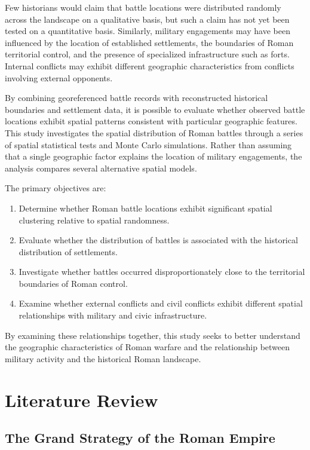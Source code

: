\documentclass[
  letterpaper,
  DIV=11,
  numbers=noendperiod]{scrartcl}
\providecommand{\tightlist}{%
  \setlength{\itemsep}{0pt}\setlength{\parskip}{0pt}}\usepackage{longtable,booktabs,array}
\begin{document}
Few historians would claim that battle locations were distributed
randomly across the landscape on a qualitative basis, but such a claim
has not yet been tested on a quantitative basis. Similarly, military
engagements may have been influenced by the location of established
settlements, the boundaries of Roman territorial control, and the
presence of specialized infrastructure such as forts. Internal conflicts
may exhibit different geographic characteristics from conflicts
involving external opponents.

By combining georeferenced battle records with reconstructed historical
boundaries and settlement data, it is possible to evaluate whether
observed battle locations exhibit spatial patterns consistent with
particular geographic features. This study investigates the spatial
distribution of Roman battles through a series of spatial statistical
tests and Monte Carlo simulations. Rather than assuming that a single
geographic factor explains the location of military engagements, the
analysis compares several alternative spatial models.

The primary objectives are:

\begin{enumerate}
\def\labelenumi{\arabic{enumi}.}
\tightlist
\item
  Determine whether Roman battle locations exhibit significant spatial
  clustering relative to spatial randomness.
\item
  Evaluate whether the distribution of battles is associated with the
  historical distribution of settlements.
\item
  Investigate whether battles occurred disproportionately close to the
  territorial boundaries of Roman control.
\item
  Examine whether external conflicts and civil conflicts exhibit
  different spatial relationships with military and civic
  infrastructure.
\end{enumerate}

By examining these relationships together, this study seeks to better
understand the geographic characteristics of Roman warfare and the
relationship between military activity and the historical Roman
landscape.

\section{Literature Review}\label{literature-review}

\subsection{The Grand Strategy of the Roman
Empire}\label{the-grand-strategy-of-the-roman-empire}
\end{document}
